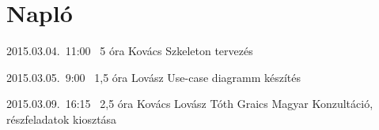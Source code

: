 %
\pagebreak
\section{Napló}

\begin{naplo}

\bejegyzes
{2015.03.04.~11:00~}
{5 óra}
{Kovács}
{Szkeleton tervezés}

\bejegyzes
{2015.03.05.~9:00~}
{1,5 óra}
{Lovász}
{Use-case diagramm készítés}

\bejegyzes
{2015.03.09.~16:15~} %
{2,5 óra} %
{Kovács\newline
Lovász\newline
Tóth\newline
Graics\newline
Magyar
} %
{Konzultáció, részfeladatok kiosztása}


\end{naplo}

